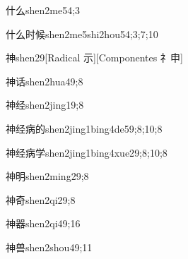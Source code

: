 \begin{verbete}{什么}{shen2me5}{4;3}
\end{verbete}

\begin{verbete}{什么时候}{shen2me5shi2hou5}{4;3;7;10}
\end{verbete}

\begin{verbete}{神}{shen2}{9}[Radical 示][Componentes 礻申]
\end{verbete}

\begin{verbete}{神话}{shen2hua4}{9;8}
\end{verbete}

\begin{verbete}{神经}{shen2jing1}{9;8}
\end{verbete}

\begin{verbete}{神经病的}{shen2jing1bing4de5}{9;8;10;8}
\end{verbete}

\begin{verbete}{神经病学}{shen2jing1bing4xue2}{9;8;10;8}
\end{verbete}

\begin{verbete}{神明}{shen2ming2}{9;8}
\end{verbete}

\begin{verbete}{神奇}{shen2qi2}{9;8}
\end{verbete}

\begin{verbete}{神器}{shen2qi4}{9;16}
\end{verbete}

\begin{verbete}{神兽}{shen2shou4}{9;11}
\end{verbete}

